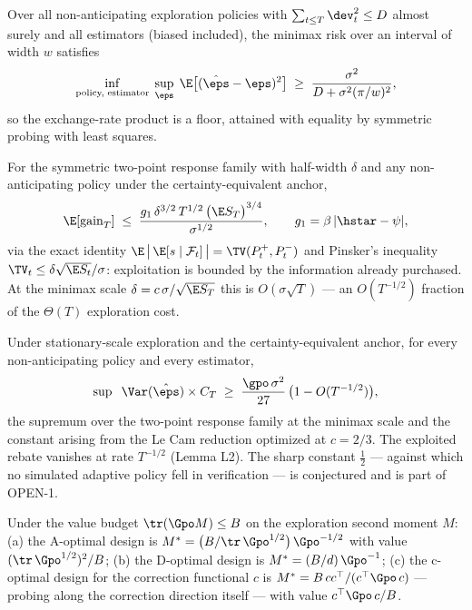 \begin{theorem}
Over all non-anticipating exploration policies with
$\sum_{t\le T} \dev_t^2 \le D$ almost surely and all estimators (biased
included), the minimax risk over an interval of width $w$ satisfies
\[
\inf_{\text{policy, estimator}}\;\sup_{\eps}\;
\E\big[(\hat\eps - \eps)^2\big] \;\ge\;
\frac{\sigma^2}{D + \sigma^2 (\pi/w)^2},
\]
so the exchange-rate product is a floor, attained with equality by
symmetric probing with least squares.
\end{theorem}

\begin{lemma}
For the symmetric two-point response family with half-width $\delta$ and
any non-anticipating policy under the certainty-equivalent anchor,
\[
\E[\mathrm{gain}_T] \;\le\;
\frac{g_1\,\delta^{3/2}\,T^{1/2}\,\big(\E S_T\big)^{3/4}}{\sigma^{1/2}},
\qquad g_1 = \beta\,|\hstar - \psi|,
\]
via the exact identity $\E\,\big|\,\E[s\mid\mathcal{F}_t]\,\big|
= \TV(P^+_t, P^-_t)$ and Pinsker's inequality
$\TV_t \le \delta\sqrt{\E S_t}/\sigma$: exploitation is bounded by the
information already purchased. At the minimax scale
$\delta = c\,\sigma/\sqrt{\E S_T}$ this is $O(\sigma\sqrt{T})$ --- an
$O(T^{-1/2})$ fraction of the $\Theta(T)$ exploration cost.
\end{lemma}

\begin{theorem}
Under stationary-scale exploration and the certainty-equivalent anchor,
for every non-anticipating policy and every estimator,
\[
\sup\;\;\Var(\hat\eps)\times C_T \;\ge\; \frac{\gpo\,\sigma^2}{27}\,
\big(1 - O(T^{-1/2})\big),
\]
the supremum over the two-point response family at the minimax scale and
the constant arising from the Le Cam reduction optimized at $c = 2/3$.
The exploited rebate vanishes at rate $T^{-1/2}$ (Lemma L2). The sharp
constant $\tfrac{1}{2}$ --- against which no simulated adaptive policy
fell in verification --- is conjectured and is part of OPEN-1.
\end{theorem}

\begin{theorem}
Under the value budget $\tr(\Gpo M) \le B$ on the exploration second
moment $M$:
(a) the A-optimal design is $M^{*} = \big(B/\tr\,\Gpo^{1/2}\big)\,
\Gpo^{-1/2}$ with value $(\tr\,\Gpo^{1/2})^2/B$;
(b) the D-optimal design is $M^{*} = (B/d)\,\Gpo^{-1}$;
(c) the c-optimal design for the correction functional $c$ is
$M^{*} = B\,cc^\top/(c^\top \Gpo\, c)$ --- probing along the correction
direction itself --- with value $c^\top \Gpo\, c / B$.
\end{theorem}

